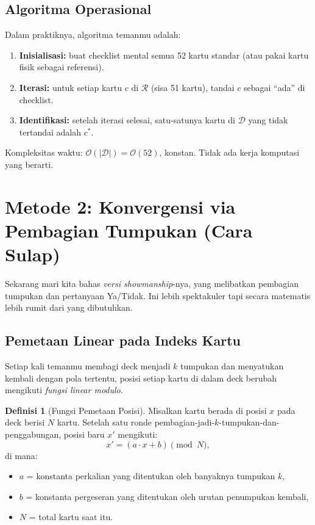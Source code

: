\documentclass[11pt,a4paper]{article}
\theoremstyle{definition}
\newtheorem{definisi}{Definisi}[section]
\begin{document}
\subsection{Algoritma Operasional}

Dalam praktiknya, algoritma temanmu adalah:

\begin{enumerate}[label=\textbf{\arabic*.}, leftmargin=*]
    \item \textbf{Inisialisasi:} buat checklist mental semua 52 kartu standar (atau pakai kartu fisik sebagai referensi).
    \item \textbf{Iterasi:} untuk setiap kartu $c$ di $\mathcal{R}$ (sisa 51 kartu), tandai $c$ sebagai ``ada'' di checklist.
    \item \textbf{Identifikasi:} setelah iterasi selesai, satu-satunya kartu di $\mathcal{D}$ yang tidak tertandai adalah $c^*$.
\end{enumerate}

Kompleksitas waktu: $\mathcal{O}(|\mathcal{D}|) = \mathcal{O}(52)$, konstan. Tidak ada kerja komputasi yang berarti.

\section{Metode 2: Konvergensi via Pembagian Tumpukan (Cara Sulap)}

Sekarang mari kita bahas \emph{versi showmanship}-nya, yang melibatkan pembagian tumpukan dan pertanyaan Ya/Tidak. Ini lebih spektakuler tapi secara matematis lebih rumit dari yang dibutuhkan.

\subsection{Pemetaan Linear pada Indeks Kartu}

Setiap kali temanmu membagi deck menjadi $k$ tumpukan dan menyatukan kembali dengan pola tertentu, posisi setiap kartu di dalam deck berubah mengikuti \emph{fungsi linear modulo}.

\begin{definisi}[Fungsi Pemetaan Posisi]
Misalkan kartu berada di posisi $x$ pada deck berisi $N$ kartu. Setelah satu ronde pembagian-jadi-$k$-tumpukan-dan-penggabungan, posisi baru $x'$ mengikuti:
\[
x' = (a \cdot x + b) \pmod{N},
\]
di mana:
\begin{itemize}
    \item $a$ = konstanta perkalian yang ditentukan oleh banyaknya tumpukan $k$,
    \item $b$ = konstanta pergeseran yang ditentukan oleh urutan penumpukan kembali,
    \item $N$ = total kartu saat itu.
\end{itemize}
\end{definisi}
\end{document}
